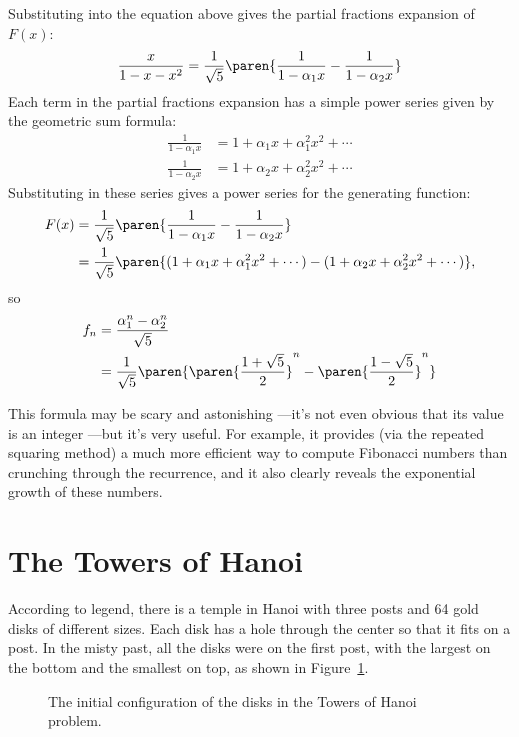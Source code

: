 Substituting into the equation above gives the partial fractions
expansion of $F(x)$:
%
\[
\frac{x}{1 - x - x^2} =
        \frac{1}{\sqrt{5}}
        \paren{\frac{1}{1 - \alpha_1 x} - \frac{1}{1 - \alpha_2 x}}
\]
%
Each term in the partial fractions expansion has a simple power series
given by the geometric sum formula:
%
\begin{align*}
\frac{1}{1 - \alpha_1 x} & = 1 + \alpha_1 x + \alpha_1^2 x^2 + \cdots \\
\frac{1}{1 - \alpha_2 x} & = 1 + \alpha_2 x + \alpha_2^2 x^2 + \cdots
\end{align*}
%
Substituting in these series gives a power series for the generating
function:
%
\begin{align*}
F(x) & =
  \frac{1}{\sqrt{5}}
  \paren{\frac{1}{1 - \alpha_1 x} -
        \frac{1}{1 - \alpha_2 x}}\\
    & = \frac{1}{\sqrt{5}}
        \paren{(1 + \alpha_1 x + \alpha_1^2 x^2 + \cdots) -
        (1 + \alpha_2 x + \alpha_2^2 x^2 + \cdots)},
\end{align*}
so
\begin{align*}
 f_n & = \frac{\alpha_1^n - \alpha_2^n}{\sqrt{5}} \\
                & = \frac{1}{\sqrt{5}}
        \paren{
         \paren{\frac{1 + \sqrt{5}}{2}}^n -
         \paren{\frac{1 - \sqrt{5}}{2}}^n}
\end{align*}

This formula may be scary and astonishing ---it's not even obvious that
its value is an integer ---but it's very useful.  For example, it provides
(via the repeated squaring method) a much more efficient way to compute
Fibonacci numbers than crunching through the recurrence, and it also
clearly reveals the exponential growth of these numbers.

\section{The Towers of Hanoi}

According to legend, there is a temple in Hanoi with three posts and
64 gold disks of different sizes.  Each disk has a hole through the
center so that it fits on a post.  In the misty past, all the disks
were on the first post, with the largest on the bottom and the
smallest on top, as shown in Figure~\ref{fig:10A1}.

\begin{figure}


\caption{The initial configuration of the disks in the Towers of Hanoi
  problem.}

\label{fig:10A1}

\end{figure}

